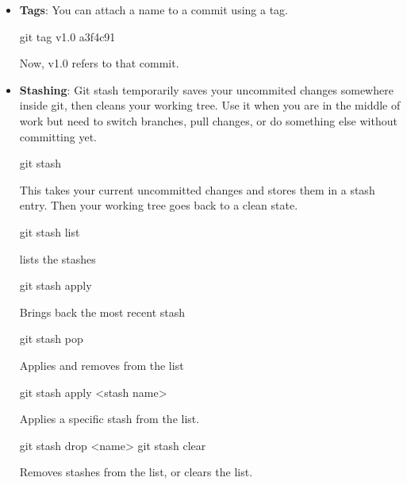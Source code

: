 \documentclass{report}
\begin{document}
\begin{itemize}
        \item \textbf{Tags}: You can attach a name to a commit using a tag.
            \bigbreak \noindent 
            \begin{bashcode}
                git tag v1.0 a3f4c91
            \end{bashcode}
            \bigbreak \noindent 
            Now, v1.0 refers to that commit.
        \item \textbf{Stashing}: Git stash temporarily saves your uncommited changes somewhere inside git, then cleans your working tree. Use it when you are in the middle of work but need to switch branches, pull changes, or do something else without committing yet.
            \bigbreak \noindent 
            \begin{bashcode}
                git stash
            \end{bashcode}
            \bigbreak \noindent 
            This takes your current uncommitted changes and stores them in a stash entry.
            \bigbreak \noindent 
            Then your working tree goes back to a clean state.
            \bigbreak \noindent 
            \begin{bashcode}
                git stash list
            \end{bashcode}
            \bigbreak \noindent 
            lists the stashes
            \bigbreak \noindent 
            \begin{bashcode}
                git stash apply
            \end{bashcode}
            \bigbreak \noindent 
            Brings back the most recent stash
            \bigbreak \noindent 
            \begin{bashcode}
                git stash pop
            \end{bashcode}
            \bigbreak \noindent 
            Applies and removes from the list
            \bigbreak \noindent 
            \begin{bashcode}
                git stash apply <stash name>
            \end{bashcode}
            \bigbreak \noindent 
            Applies a specific stash from the list.
            \bigbreak \noindent 
            \begin{bashcode}
                git stash drop <name>
                git stash clear
            \end{bashcode}
            \bigbreak \noindent 
            Removes stashes from the list, or clears the list.
            \bigbreak \noindent 

\end{itemize}
\end{document}
